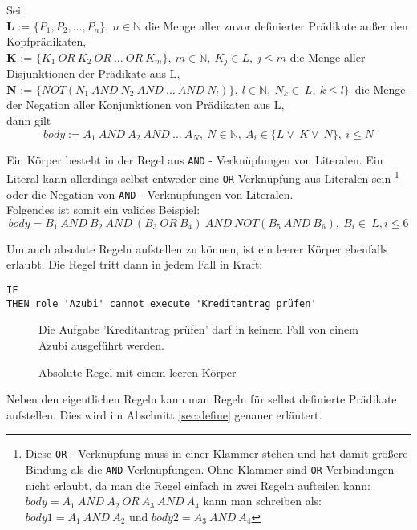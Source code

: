 Sei\\
\textbf{L} := $\{P_1,P_2,...,P_n\},\ n\in\mathbb{N}$ die Menge aller zuvor definierter Prädikate außer den Kopfprädikaten,\\
\textbf{K} := $\{K_1\ OR\ K_2\ OR\ ...\ OR\ K_m\},\ m \in \mathbb{N},\ K_j \in L,\ j \leq m$ die Menge aller Disjunktionen der Prädikate aus L,\\
\textbf{N} := $\{NOT(N_1\ AND\ N_2\ AND\ ...\ AND\ N_l)\},\ l \in \mathbb{N},\ N_k\in\ L,\ k \leq l\}$\ die Menge der Negation aller Konjunktionen von Prädikaten aus L,\\
dann gilt $$body := A_1\ AND\ A_2\ AND\ ...\ A_N,\ N\in\mathbb{N},\ A_i\in \{L\vee\ K\vee\ N\},\ i \leq N$$


Ein Körper besteht in der Regel aus \texttt{AND} - Verknüpfungen von Literalen. Ein Literal kann allerdings selbst entweder eine \texttt{OR}-Verknüpfung aus Literalen sein \footnote{Diese \texttt{OR} - Verknüpfung muss in einer Klammer stehen und hat damit größere Bindung als die \texttt{AND}-Verknüpfungen. Ohne Klammer sind \texttt{OR}-Verbindungen nicht erlaubt, da man die Regel einfach in zwei Regeln aufteilen kann: $body=A_1\ AND\ A_2\ OR\ A_3\ AND\ A_4$ kann man schreiben als: $body1 =A_1\ AND\ A_2 $ und $body2=A_3\ AND\ A_4$} oder die Negation von \texttt{AND} - Verknüpfungen von Literalen.\\ 
Folgendes ist somit ein valides Beispiel:
$$body=B_1\ AND\ B_2\ AND\ (B_3\ OR\ B_4)\ AND\ NOT(B_5\ AND\ B_6),\ B_i\in\ L, i \leq 6$$

Um auch absolute Regeln aufstellen zu können, ist ein leerer Körper ebenfalls erlaubt. Die Regel tritt dann in jedem Fall in Kraft:

\begin{verbatim}
IF 
THEN role 'Azubi' cannot execute 'Kreditantrag prüfen'
\end{verbatim}
\begin{figure}[!h]
\small Die Aufgabe 'Kreditantrag prüfen' darf in keinem Fall von einem Azubi ausgeführt werden.
\caption{Absolute Regel mit einem leeren Körper}
\label{fig:absolute}
\end{figure}

Neben den eigentlichen Regeln kann man Regeln für selbst definierte Prädikate aufstellen. Dies wird im Abschnitt \ref{sec:define} genauer erläutert.

